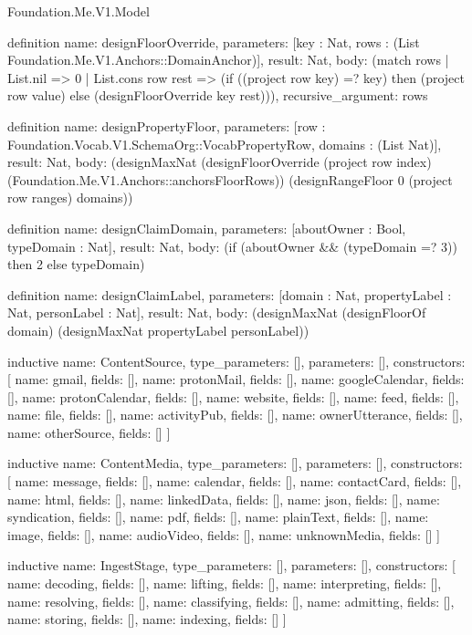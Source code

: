\begin{lexlean}{Foundation.Me.V1.Model}
\begin{semanticmodule}
definition{
  name: designFloorOverride,
  parameters: [key : Nat, rows : (List Foundation.Me.V1.Anchors::DomainAnchor)],
  result: Nat,
  body: (match rows
    | List.nil => 0
    | List.cons row rest => (if ((project row key) =? key) then (project row value) else (designFloorOverride key rest))),
  recursive_argument: rows
}

definition{
  name: designPropertyFloor,
  parameters: [row : Foundation.Vocab.V1.SchemaOrg::VocabPropertyRow, domains : (List Nat)],
  result: Nat,
  body: (designMaxNat (designFloorOverride (project row index) (Foundation.Me.V1.Anchors::anchorsFloorRows)) (designRangeFloor 0 (project row ranges) domains))
}

definition{
  name: designClaimDomain,
  parameters: [aboutOwner : Bool, typeDomain : Nat],
  result: Nat,
  body: (if (aboutOwner && (typeDomain =? 3)) then 2 else typeDomain)
}

definition{
  name: designClaimLabel,
  parameters: [domain : Nat, propertyLabel : Nat, personLabel : Nat],
  result: Nat,
  body: (designMaxNat (designFloorOf domain) (designMaxNat propertyLabel personLabel))
}

inductive{
  name: ContentSource,
  type_parameters: [],
  parameters: [],
  constructors: [
    {name: gmail, fields: []},
    {name: protonMail, fields: []},
    {name: googleCalendar, fields: []},
    {name: protonCalendar, fields: []},
    {name: website, fields: []},
    {name: feed, fields: []},
    {name: file, fields: []},
    {name: activityPub, fields: []},
    {name: ownerUtterance, fields: []},
    {name: otherSource, fields: []}
  ]
}

inductive{
  name: ContentMedia,
  type_parameters: [],
  parameters: [],
  constructors: [
    {name: message, fields: []},
    {name: calendar, fields: []},
    {name: contactCard, fields: []},
    {name: html, fields: []},
    {name: linkedData, fields: []},
    {name: json, fields: []},
    {name: syndication, fields: []},
    {name: pdf, fields: []},
    {name: plainText, fields: []},
    {name: image, fields: []},
    {name: audioVideo, fields: []},
    {name: unknownMedia, fields: []}
  ]
}

inductive{
  name: IngestStage,
  type_parameters: [],
  parameters: [],
  constructors: [
    {name: decoding, fields: []},
    {name: lifting, fields: []},
    {name: interpreting, fields: []},
    {name: resolving, fields: []},
    {name: classifying, fields: []},
    {name: admitting, fields: []},
    {name: storing, fields: []},
    {name: indexing, fields: []}
  ]
}


\end{semanticmodule}
\end{lexlean}
